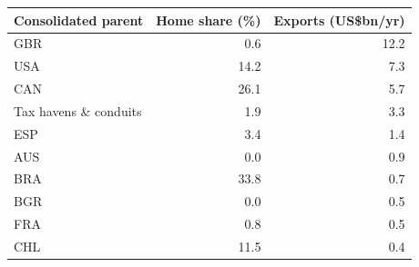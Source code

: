\begin{tabular}{lrr}
\toprule
Consolidated parent & Home share (\%) & Exports (US\$bn/yr) \\
\midrule
GBR & 0.6 & 12.2 \\
USA & 14.2 & 7.3 \\
CAN & 26.1 & 5.7 \\
Tax havens \& conduits & 1.9 & 3.3 \\
ESP & 3.4 & 1.4 \\
AUS & 0.0 & 0.9 \\
BRA & 33.8 & 0.7 \\
BGR & 0.0 & 0.5 \\
FRA & 0.8 & 0.5 \\
CHL & 11.5 & 0.4 \\
\bottomrule
\end{tabular}
